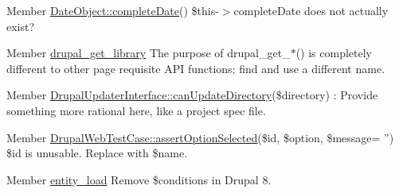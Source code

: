 \label{todo__todo000048}
\hypertarget{todo__todo000048}{}
 
\begin{DoxyDescription}
\item[Member \hyperlink{classDateObject_af83b95282617a2d2ec4dded415f84ed7}{DateObject::completeDate}() ]\$this-\/$>$completeDate does not actually exist? 
\end{DoxyDescription}

\label{todo__todo000001}
\hypertarget{todo__todo000001}{}
 
\begin{DoxyDescription}
\item[Member \hyperlink{common_8inc_aa535ac5edd443308d3b2812caf1a1b85}{drupal\_\-get\_\-library} ]The purpose of drupal\_\-get\_\-$\ast$() is completely different to other page requisite API functions; find and use a different name. 
\end{DoxyDescription}

\label{todo__todo000008}
\hypertarget{todo__todo000008}{}
 
\begin{DoxyDescription}
\item[Member \hyperlink{interfaceDrupalUpdaterInterface_a3ff6c92f6ed593e03f5e36788ef2d2cc}{DrupalUpdaterInterface::canUpdateDirectory}(\$directory) ]: Provide something more rational here, like a project spec file.


\end{DoxyDescription}

\label{todo__todo000020}
\hypertarget{todo__todo000020}{}
 
\begin{DoxyDescription}
\item[Member \hyperlink{classDrupalWebTestCase_a95c2f2a414be5f4f52688c0549ef60ec}{DrupalWebTestCase::assertOptionSelected}(\$id, \$option, \$message= '') ]\$id is unusable. Replace with \$name. 
\end{DoxyDescription}

\label{todo__todo000002}
\hypertarget{todo__todo000002}{}
 
\begin{DoxyDescription}
\item[Member \hyperlink{common_8inc_a78b89cf93f9710a68d02f86adccf1898}{entity\_\-load} ]Remove \$conditions in Drupal 8.


\end{DoxyDescription}

\label{todo__todo000004}
\hypertarget{todo__todo000004}{}
 
